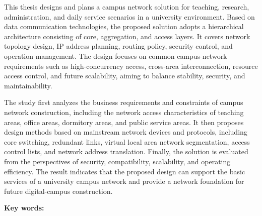 
This thesis designs and plans a campus network solution for teaching, research, administration, and daily service scenarios in a university environment. Based on data communication technologies, the proposed solution adopts a hierarchical architecture consisting of core, aggregation, and access layers. It covers network topology design, IP address planning, routing policy, security control, and operation management. The design focuses on common campus-network requirements such as high-concurrency access, cross-area interconnection, resource access control, and future scalability, aiming to balance stability, security, and maintainability.

The study first analyzes the business requirements and constraints of campus network construction, including the network access characteristics of teaching areas, office areas, dormitory areas, and public service areas. It then proposes design methods based on mainstream network devices and protocols, including core switching, redundant links, virtual local area network segmentation, access control lists, and network address translation. Finally, the solution is evaluated from the perspectives of security, compatibility, scalability, and operating efficiency. The result indicates that the proposed design can support the basic services of a university campus network and provide a network foundation for future digital-campus construction.

\vspace{0.6em}
\noindent\textbf{Key words:} \gccKeywordsEn

